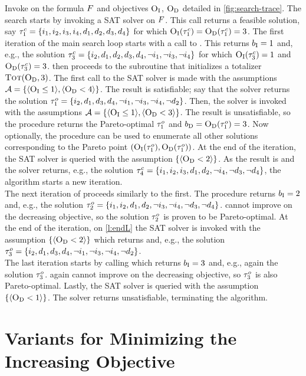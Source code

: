 \begin{example}\label{ex:main-iteration}
  Invoke \algname{} on the formula $F$ and objectives $\textsc{O}_{\text{I}}$, $\textsc{O}_{\text{D}}$ detailed in \cref{fig:search-trace}. 
  The search starts by invoking a SAT solver on $F$.
  This call returns a feasible solution, say $\tau^c_1 = \{i_1,\allowbreak i_2,\allowbreak i_3,\allowbreak i_4,\allowbreak d_1,\allowbreak d_2,\allowbreak d_3,\allowbreak d_4\}$ for which $\textsc{O}_{\text{I}}(\tau^c_1) = \textsc{O}_{\text{D}}(\tau^c_1) = 3$. 
  The first iteration of the main search loop starts with a call to \Min{}.
  This returns $b_{\text{I}} = 1$ and, e.g., the solution $\tau^c_3 = \{i_2,\allowbreak d_1,\allowbreak d_2,\allowbreak d_3,\allowbreak d_4,\allowbreak \lnot i_1,\allowbreak \lnot i_3,\allowbreak \lnot i_4\}$ for which $\textsc{O}_{\text{I}}(\tau^c_3) = 1$ and $\textsc{O}_{\text{D}}(\tau^c_3) = 3$.
  \algname{} then proceeds to the \Simpr{} subroutine that initializes a totalizer $\textsc{Tot}(\textsc{O}_{\text{D}}, 3)$.
  The first call to the SAT solver is made with the assumptions $\mathcal{A} = \{ \langle \textsc{O}_{\text{I}} \leq 1 \rangle, \langle \textsc{O}_{\text{D}} < 4 \rangle \}$.
  The result is satisfiable;
  say that the solver returns the solution $\tau^o_1 = \{i_2,\allowbreak d_1,\allowbreak d_3,\allowbreak d_4,\allowbreak \lnot i_1,\allowbreak \lnot i_3,\allowbreak \lnot i_4,\allowbreak \lnot d_2\}$.
  Then, the solver is invoked with the assumptions $\mathcal{A} =  \{ \langle \textsc{O}_{\text{I}} \leq 1 \rangle, \langle \textsc{O}_{\text{D}} < 3 \rangle \}$.
  The result is unsatisfiable, so the procedure returns the Pareto-optimal $\tau^o_1$ and $b_{\text{D}} = \textsc{O}_{\text{D}}(\tau^o_1) = 3$.
  Now optionally, the procedure \E{} can be used to enumerate all other solutions corresponding to the Pareto point $(\textsc{O}_{\text{I}}(\tau^o_1),\textsc{O}_{\text{D}}(\tau^o_1))$.
  At the end of the iteration, the SAT solver is queried with the assumption $\{ \langle \textsc{O}_{\text{D}} < 2 \rangle \}$.
  As the result is \sat{} and the solver returns, e.g., the solution $\tau^c_4 = \{i_1,\allowbreak i_2,\allowbreak i_3,\allowbreak d_1,\allowbreak d_2,\allowbreak \lnot i_4,\allowbreak \lnot d_3,\allowbreak \lnot d_4\}$,
  the algorithm starts a new iteration. \\
  The next iteration of \algname{} proceeds similarly to the first.
  The procedure \Min{} returns $b_{\text{I}} = 2$ and, e.g., the solution $\tau^o_2 = \{i_1,\allowbreak i_2,\allowbreak d_1,\allowbreak d_2,\allowbreak \lnot i_3,\allowbreak \lnot i_4,\allowbreak \lnot d_3,\allowbreak \lnot d_4\}$.
  \Simpr{} cannot improve on the decreasing objective, so the solution $\tau^o_2$ is proven to be Pareto-optimal.
  At the end of the iteration, on \cref{l:endL} the SAT solver is invoked with the assumption $\{\langle \textsc{O}_{\text{D}} < 2 \rangle\}$ which returns \sat{} and, e.g., the solution $\tau^o_3 = \{i_2,\allowbreak d_1,\allowbreak d_3,\allowbreak d_4,\allowbreak \lnot i_1,\allowbreak \lnot i_3,\allowbreak \lnot i_4,\allowbreak \lnot d_2\}$. \\
  The last iteration starts by calling \Min{} which returns $b_{\text{I}} = 3$ and, e.g., again the solution $\tau^o_3$.
  \Simpr{} again cannot improve on the decreasing objective, so $\tau^o_3$ is also Pareto-optimal.
  Lastly, the SAT solver is queried with the assumption $\{\langle \textsc{O}_{\text{D}} < 1 \rangle\}$.
  The solver returns unsatisfiable, terminating the algorithm. 
\end{example}

\section{Variants for Minimizing the Increasing Objective\label{sec:variants}}

